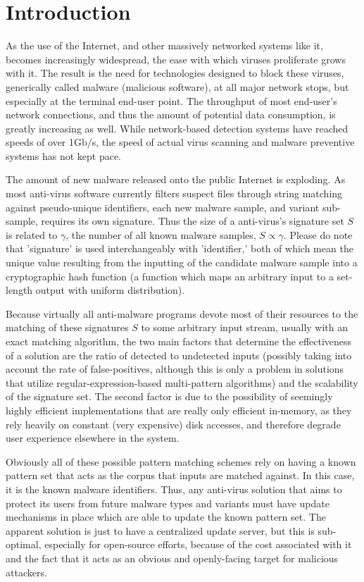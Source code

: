 \documentclass[12pt,journal]{IEEEtran}
\begin{document}
\section{Introduction}
As the use of the Internet, and other massively networked systems like it, becomes increasingly widespread, the ease with which viruses proliferate grows with it. The result is the need for technologies designed to block these viruses, generically called malware (malicious software), at all major network stops, but especially at the terminal end-user point. The throughput of most end-user's network connections, and thus the amount of potential data consumption, is greatly increasing as well. While network-based detection systems have reached speeds of over 1Gb/s, the speed of actual virus scanning and malware preventive systems has not kept pace.\par
The amount of new malware released onto the public Internet is exploding\cite{Garetto2003}. As most anti-virus software currently filters suspect files through string matching against pseudo-unique identifiers, each new malware sample, and variant sub-sample, requires its own signature\cite{Chen2004}. Thus the size of a anti-virus's signature set $S$ is related to $\gamma$, the number of all known malware samples, $S \propto \gamma$. Please do note that 'signature' is used interchangeably with 'identifier,' both of which mean the unique value resulting from the inputting of the candidate malware sample into a cryptographic hash function (a function which maps an arbitrary input to a set-length output with uniform distribution).\par

Because virtually all anti-malware programs devote most of their resources to the matching of these signatures $S$ to some arbitrary input stream, usually with an exact matching algorithm, the two main factors that determine the effectiveness of a solution are the ratio of detected to undetected inputs (possibly taking into account the rate of false-positives, although this is only a problem in solutions that utilize regular-expression-based multi-pattern algorithms) and the scalability of the signature set. The second factor is due to the possibility of seemingly highly efficient implementations that are really only efficient in-memory, as they rely heavily on constant (very expensive) disk accesses, and therefore degrade user experience elsewhere in the system.\par

Obviously all of these possible pattern matching schemes rely on having a known pattern set that acts as the corpus that inputs are matched against. In this case, it is the known malware identifiers. Thus, any anti-virus solution that aims to protect its users from future malware types and variants must have update mechanisms in place which are able to update the known pattern set. The apparent solution is just to have a centralized update server, but this is sub-optimal, especially for open-source efforts, because of the cost associated with it and the fact that it acts as an obvious and openly-facing target for malicious attackers.\par
\end{document}
